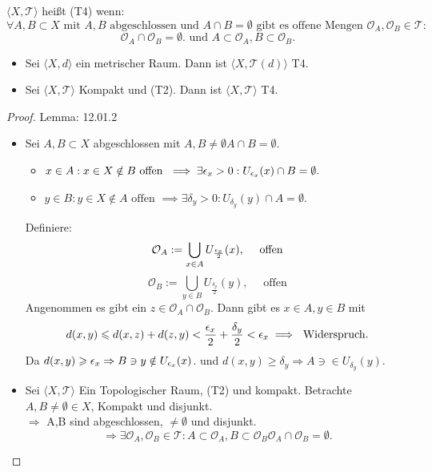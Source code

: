 \chapter{}

\dfn{}
{
$\langle X, \mathcal{T} \rangle$ heißt (T4) wenn:
$$\forall A, B \subset X \text{ mit } A, B \text{ abgeschlossen und } A \cap B = \emptyset 
\text{ gibt es offene Mengen } \mathcal{O}_A, \mathcal{O}_B \in \mathcal{T}:$$
$$\mathcal{O}_A \cap \mathcal{O}_B = \emptyset.\text{ und }
 A \subset \mathcal{O}_A, B \subset \mathcal{O}_B.$$
}

\mlenma{}
{
    \begin{itemize}
        \item[(i)] Sei $\langle X, d \rangle$ ein metrischer Raum. 
        Dann ist $\langle X, \mathcal{T}(d) \rangle$ T4.
        \item[(ii)] Sei $\langle X, \mathcal{T} \rangle$ Kompakt und (T2). 
        Dann ist $\langle X, \mathcal{T} \rangle$ T4.
    \end{itemize}
}

\begin{proof}{Lemma: 12.01.2 }
    \begin{itemize}
        \item [(i)] Sei $A, B \subset X$ abgeschlossen mit
         $A,B \neq \emptyset A \cap B = \emptyset$.
         \begin{itemize}
            \item[Fall:] $x \in A: x \in X\notin B\text{ offen }\implies 
            \exists \epsilon_x > 0: U_{\epsilon_x}(x) \cap B = \emptyset.$
            \item[Fall:] $y \in B: y \in X\notin A\text{ offen }\implies
            \exists \delta_y > 0: U_{\delta_y}(y) \cap A = \emptyset.$
        \end{itemize}
        Definiere:
        $$\mathcal{O}_A := \bigcup_{x \in A} U_{\frac{\epsilon_x}{2}}(x),\quad \text{ offen}$$
        $$\mathcal{O}_B := \bigcup_{y \in B} U_{\frac{\delta_y}{2}}(y),\quad \text{ offen}$$
        Angenommen es gibt ein $z \in \mathcal{O}_A \cap \mathcal{O}_B$.
        Dann gibt es $x \in A, y \in B$ mit
        $$d(x,y) \leqslant d(x,z) + d(z,y) < \frac{\epsilon_x}{2} + \frac{\delta_y}{2}
        < \epsilon_x \implies \text{ Widerspruch}.$$ Da 
        $d(x,y) \geqslant \epsilon_x \Rightarrow B\ni y \notin U_{\epsilon_x}(x) $. und 
        $d(x,y) \geq \delta_y \Rightarrow A \ni \in U_{\delta_y}(y)$.
        \item[(ii)] Sei $\langle X, \mathcal{T} \rangle$ Ein Topologischer Raum, (T2) und kompakt.
        Betrachte $A,B \neq \emptyset \in X $, Kompakt und disjunkt.\\
        $\Rightarrow$ A,B sind abgeschlossen, $\neq \emptyset$ und disjunkt.
       $$\Rightarrow \exists \mathcal{O}_A, \mathcal{O}_B \in \mathcal{T}:
         A \subset \mathcal{O}_A, B \subset \mathcal{O}_B \mathcal{O}_A \cap \mathcal{O}_B = \emptyset.$$
    \end{itemize}
\end{proof}

